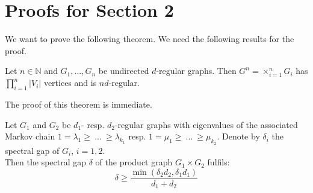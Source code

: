 \appendix
\section{Proofs for Section 2}
We want to prove the following theorem.
\thmProdJohnsonGraph*
We need the following results for the proof.
\begin{theorem}
\label{thm:productgraphs_regular}
Let $n \in \mathbb{N}$ and $G_1, ..., G_n$ be undirected $d$-regular graphs. Then $G^n = \times_{i=1}^n G_i$ has $\prod_{i=1}^n |V_i|$ vertices and is $nd$-regular.
\end{theorem}
The proof of this theorem is immediate.
\begin{theorem}
\label{thm:spectralgap_productgraphs}
Let $G_1$ and $G_2$ be $d_1$- resp. $d_2$-regular graphs with eigenvalues of the associated Markov chain $1 = \lambda_1 \geq~...~\geq \lambda_{k_1}$ resp. $1 = \mu_1 \geq~...~ \geq \mu_{k_2}$.
Denote by $\delta_i$ the spectral gap of $G_i$, $i=1,2$.\\
Then the spectral gap $\delta$ of the product graph $G_1 \times G_2$ fulfils:
$$\delta \geq \frac{\min\left(\delta_2d_2, \delta_1d_1\right)}{d_1 + d_2}$$
\end{theorem}
